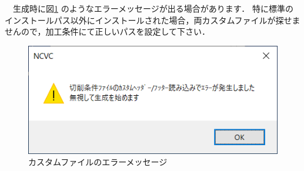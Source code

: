　生成時に図\ref{fig:error.png} のようなエラーメッセージが出る場合があります．
特に標準のインストールパス以外にインストールされた場合，両カスタムファイルが探せませんので，加工条件にて正しいパスを設定して下さい．

\begin{figure}[H]
\centering
\includegraphics{No2/fig/error.png}
\caption{カスタムファイルのエラーメッセージ}
\label{fig:error.png}
\end{figure}
